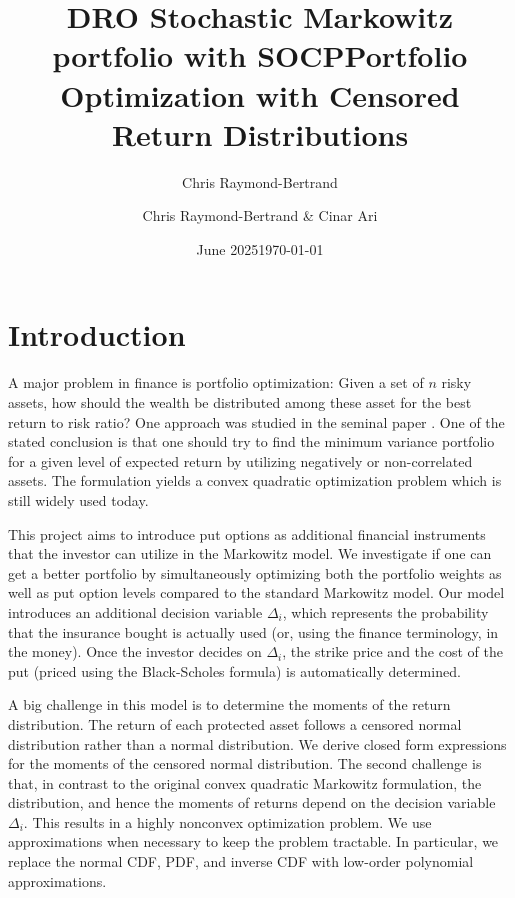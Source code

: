 \documentclass[11pt]{article}
\title{DRO Stochastic Markowitz portfolio with SOCP}
\author{Chris Raymond-Bertrand}
\date{June 2025}
\title{\vspace{-.5in}Portfolio Optimization with Censored Return Distributions}
\author{Chris Raymond-Bertrand \& Cinar Ari}
\date{\today}
\begin{document}
\maketitle


%


\section{Introduction}
A major problem in finance is portfolio optimization: Given a set of $n$ risky assets, how should the wealth be distributed among these asset for the best return to risk ratio? One approach was studied in the seminal paper \cite{markowitz1952}. One of the stated conclusion is that one should try to find the minimum variance portfolio for a given level of expected return by utilizing negatively or non-correlated assets. The formulation yields a convex quadratic optimization problem which is still widely used today.

This project aims to introduce put options as additional financial instruments that the investor can utilize in the Markowitz model. We investigate if one can get a better portfolio by simultaneously optimizing both the portfolio weights as well as put option levels compared to the standard Markowitz model. Our model introduces an additional decision variable $\Delta_i$, which represents the probability that the insurance bought is actually used (or, using the finance terminology, in the money). Once the investor decides on $\Delta_i$, the strike price and the cost of the put (priced using the Black-Scholes formula) is automatically determined. 

A big challenge in this model is to determine the moments of the return distribution. The return of each protected asset follows a censored normal distribution rather than a normal distribution. We derive closed form expressions for the moments of the censored normal distribution. The second challenge is that, in contrast to the original convex quadratic Markowitz formulation, the distribution, and hence the moments of returns depend on the decision variable $\Delta_i$. This results in a highly nonconvex optimization problem. We use approximations when necessary to keep the problem tractable. In particular, we replace the normal CDF, PDF, and inverse CDF with low-order polynomial approximations. 
\end{document}
